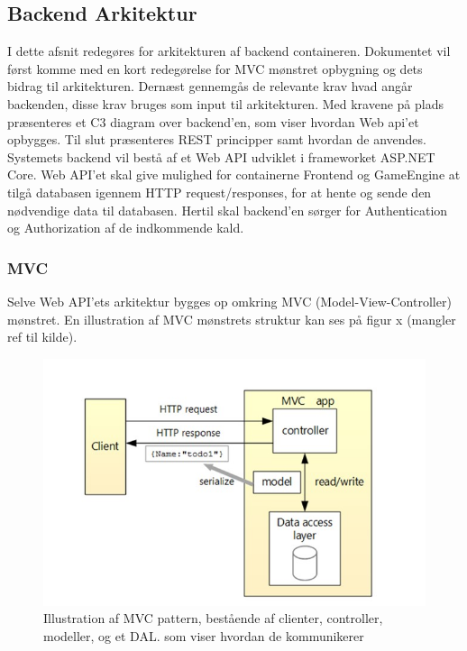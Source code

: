 \subsection{Backend Arkitektur}

I dette afsnit redegøres for arkitekturen af backend containeren. Dokumentet vil først komme med en kort redegørelse for MVC mønstret opbygning og dets bidrag til arkitekturen. Dernæst gennemgås de relevante krav hvad angår backenden, disse krav bruges som input til arkitekturen. Med kravene på plads præsenteres et C3 diagram over backend’en, som viser hvordan Web api’et opbygges. Til slut præsenteres REST principper samt hvordan de anvendes.
Systemets backend vil bestå af et Web API udviklet i frameworket ASP.NET Core. Web API’et skal give mulighed for containerne Frontend og GameEngine at tilgå databasen igennem HTTP request/responses, for at hente og sende den nødvendige data til databasen. Hertil skal backend’en sørger for Authentication og Authorization af de indkommende kald.\\

\subsubsection{MVC}
Selve Web API’ets arkitektur bygges op omkring MVC (Model-View-Controller) mønstret. En illustration af MVC mønstrets struktur kan ses på figur x (mangler ref til kilde).

\begin{figure}[H]
\centering
\includegraphics[width = \textwidth]{02-Body/Images/MVC_pattern.JPG}
\caption{Illustration af MVC pattern, bestående af clienter, controller, modeller, og et DAL. som viser hvordan de kommunikerer}
\label{fig:Arkitektur-Backend-MVC}
\end{figure}

